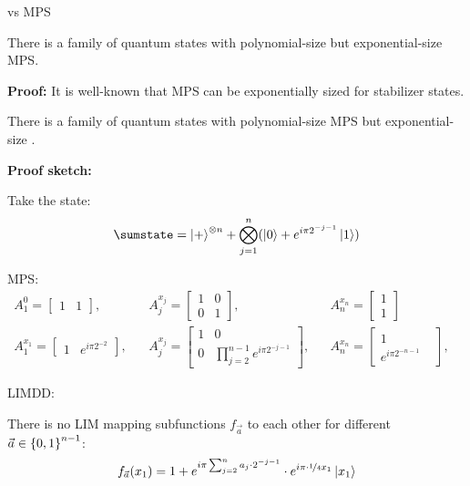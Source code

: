\begin{frame}{\limdd vs MPS}


\begin{lemma}
	There is a family of quantum states with polynomial-size \limdd but exponential-size MPS.
\end{lemma}

\vspace{-.5em}

\textbf{Proof:} It is well-known that MPS can be exponentially sized for stabilizer states.


\vspace{.5em}

\pause


\begin{lemma}
	There is a family of quantum states with polynomial-size MPS but exponential-size \limdd.
\end{lemma}


\vspace{-.5em}
\textbf{Proof sketch:} 

Take the state: \vspace{-2.5em}
\begin{align}
\sumstate = \ket{+}^{\otimes n} + \bigotimes_{j=1}^n(\ket 0+e^{i\pi 2^{-j-1}}\ket 1)
\end{align}


\pause
MPS: \vspace{-2.5em}
\begin{align*}
	    A^{0}_1 = \begin{bmatrix} 1 & 1\end{bmatrix}, ~~~~  &A^{x_j}_j = \begin{bmatrix} 1 &  0 \\ 0 & 1 \end{bmatrix}, ~~~~~~ &&A^{x_n}_n = \begin{bmatrix} 1 \\ 1\end{bmatrix}&\\
	    A^{x_1}_1 = \begin{bmatrix} 1 & e^{i\pi 2^{-2}}\end{bmatrix}, ~~~~  &A^{x_j}_j = \begin{bmatrix} 1 &  0 \\ 0 & \prod_{j=2}^{n-1}e^{i\pi 2^{-j-1}}\end{bmatrix},  && A^{x_n}_n = \begin{bmatrix} 1 \\ e^{i\pi 2^{-n-1}}&\end{bmatrix},
	\end{align*}	

\pause
LIMDD:

There is no LIM mapping subfunctions $f_{\vec a}$ 
to each other for different ${\vec a}\in \left\lbrace 0,1 \right\rbrace^{n-1}$:
\[
f_{\vec a}(x_1) = 1 + e^{i\pi \sum_{j=2}^n a_j \cdot 2^{-j-1}} \cdot
e^{i\pi \cdot \nicefrac14 x_1 } \ket{x_1}
\]

\end{frame}



